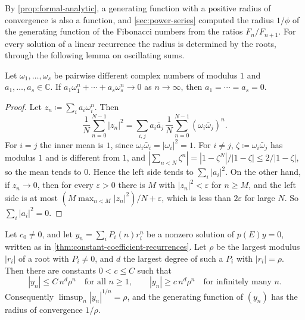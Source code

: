 By \cref{prop:formal-analytic}, a generating function with a positive radius of convergence is also a function, and \cref{sec:power-series} computed the radius $1/\phi$ of the generating function of the Fibonacci numbers from the ratios $F_n/F_{n+1}$. For every solution of a linear recurrence the radius is determined by the roots, through the following lemma on oscillating sums.

\begin{lemma}
\label{lem:unimodular-means}
Let $\omega_1,\ldots,\omega_s$ be pairwise different complex numbers of modulus $1$ and $a_1,\ldots,a_s\in\mathbb C$. If $a_1\omega_1^n+\cdots+a_s\omega_s^n\to0$ as $n\to\infty$, then $a_1=\cdots=a_s=0$.
\end{lemma}

\begin{proof}
Let $z_n\coloneqq\sum_ia_i\omega_i^n$. Then
\[
\frac1N\sum_{n=0}^{N-1}|z_n|^2=\sum_{i,j}a_i\bar a_j\,\frac1N\sum_{n=0}^{N-1}(\omega_i\bar\omega_j)^n .
\]
For $i=j$ the inner mean is $1$, since $\omega_i\bar\omega_i=|\omega_i|^2=1$. For $i\ne j$, $\zeta\coloneqq\omega_i\bar\omega_j$ has modulus $1$ and is different from $1$, and $|\sum_{n<N}\zeta^n|=|1-\zeta^N|/|1-\zeta|\le2/|1-\zeta|$, so the mean tends to $0$. Hence the left side tends to $\sum_i|a_i|^2$. On the other hand, if $z_n\to0$, then for every $\varepsilon>0$ there is $M$ with $|z_n|^2<\varepsilon$ for $n\ge M$, and the left side is at most $(M\max_{n<M}|z_n|^2)/N+\varepsilon$, which is less than $2\varepsilon$ for large $N$. So $\sum_i|a_i|^2=0$.
\end{proof}

\begin{proposition}
\label{prop:recurrence-growth}
Let $c_0\ne0$, and let $y_n=\sum_iP_i(n)r_i^n$ be a nonzero solution of $p(E)y=0$, written as in \cref{thm:constant-coefficient-recurrences}. Let $\rho$ be the largest modulus $|r_i|$ of a root with $P_i\ne0$, and $d$ the largest degree of such a $P_i$ with $|r_i|=\rho$. Then there are constants $0<c\le C$ such that
\[
|y_n|\le C\,n^d\rho^n\quad\text{for all }n\ge1,\qquad|y_n|\ge c\,n^d\rho^n\quad\text{for infinitely many }n .
\]
Consequently $\limsup_n|y_n|^{1/n}=\rho$, and the generating function of $(y_n)$ has the radius of convergence $1/\rho$.
\end{proposition}

